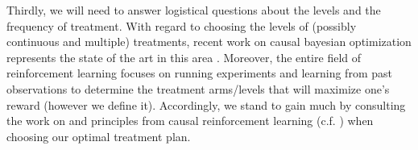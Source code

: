 Thirdly, we will need to answer logistical questions about the levels and the frequency of treatment.
With regard to choosing the levels of (possibly continuous and multiple) treatments, recent work on causal bayesian optimization represents the state of the art in this area \citep{aglietti_2020_causal}.
Moreover, the entire field of reinforcement learning focuses on running experiments and learning from past observations to determine the treatment arms/levels that will maximize one's reward (however we define it).
Accordingly, we stand to gain much by consulting the work on and principles from causal reinforcement learning (c.f. \citet{bareinboim_2015_bandits}) when choosing our optimal treatment plan.
